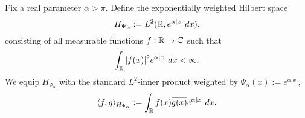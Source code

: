 \begin{definition}
\label{def:weighted_Hilbert_space_HPsi}
Fix a real parameter \( \alpha > \pi \). Define the exponentially weighted Hilbert space
\[
H_{\Psi_\alpha} := L^2(\mathbb{R}, e^{\alpha |x|} \, dx),
\]
consisting of all measurable functions \( f : \mathbb{R} \to \mathbb{C} \) such that
\[
\int_{\mathbb{R}} |f(x)|^2 e^{\alpha |x|} \, dx < \infty.
\]
We equip \( H_{\Psi_\alpha} \) with the standard \( L^2 \)-inner product weighted by \( \Psi_\alpha(x) := e^{\alpha|x|} \),
\[
\langle f, g \rangle_{H_{\Psi_\alpha}} := \int_{\mathbb{R}} f(x) \overline{g(x)} e^{\alpha |x|} \, dx.
\]
\end{definition}
